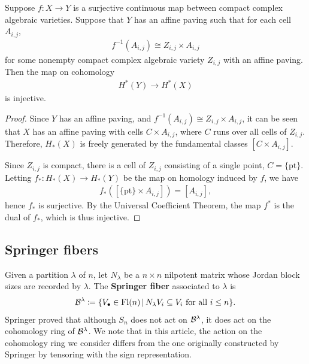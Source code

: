 \documentclass[12pt]{amsart}
\newcommand{\st}{\,|\,}
\newcommand{\Fl}{\mathrm{Fl}}
\begin{document}
\begin{lemma}\label{lem:InjectiveCoh}
Suppose $f: X\to Y$ is a surjective continuous map between compact complex algebraic varieties. Suppose that $Y$ has an affine paving such that for each cell $A_{i,j}$,
\begin{align}
    f^{-1}(A_{i,j}) \cong Z_{i,j}\times A_{i,j}
\end{align}
for some nonempty compact complex algebraic variety $Z_{i,j}$ with an affine paving. Then the map on cohomology
\begin{align}
    H^*(Y)\to H^*(X)
\end{align}
is injective.
\end{lemma}

\begin{proof}
Since $Y$ has an affine paving, and $f^{-1}(A_{i,j})\cong Z_{i,j} \times A_{i,j}$, it can be seen that $X$ has an affine paving with cells $C\times A_{i,j}$, where $C$ runs over all cells of $Z_{i,j}$. 
 Therefore, $H_*(X)$ is freely generated by the fundamental classes $[C\times A_{i,j}]$. 

Since $Z_{i,j}$ is compact, there is a cell of $Z_{i,j}$ consisting of a single point, $C = \{\text{pt}\}$. Letting $f_* : H_*(X)\to H_*(Y)$ be the map on homology induced by $f$, we have
\begin{align}
f_*([\{\text{pt}\}\times A_{i,j}]) = [A_{i,j}],
\end{align}
hence $f_*$ is surjective. 
By the Universal Coefficient Theorem, the map $f^*$ is the dual of $f_*$, which is thus injective.
\end{proof}

\subsection{Springer fibers}

Given a partition $\lambda$ of $n$, let $N_\lambda$ be a $n\times n$ nilpotent matrix whose Jordan block sizes are recorded by $\lambda$. The {\bf Springer fiber} associated to $\lambda$ is
\begin{align}
    \cB^\lambda \coloneqq \{V_\bullet \in \Fl(n) \st N_\lambda V_i\subseteq V_i \text{ for all } i\leq n\}.
\end{align}
Springer proved that although $S_n$ does not act on $\mathcal{B}^\lambda$, it does act on the cohomology ring of $\mathcal{B}^\lambda$. We note that in this article, the action on the cohomology ring we consider differs from the one originally constructed by Springer by tensoring with the sign representation.
\end{document}
